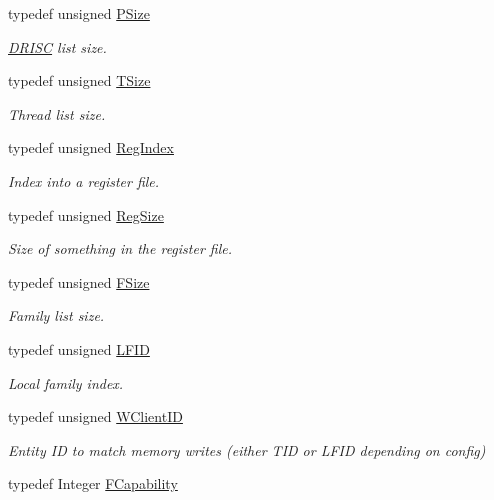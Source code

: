 \begin{DoxyCompactItemize}
typedef unsigned \hyperlink{namespace_simulator_a4aa07bee2f34beac11abf48a8ccc47c4}{P\+Size}
\begin{DoxyCompactList}\small\item\em \hyperlink{class_simulator_1_1_d_r_i_s_c}{D\+R\+I\+S\+C} list size. \end{DoxyCompactList}\item 
typedef unsigned \hyperlink{namespace_simulator_aefe00209f3ea9f8e24874de522c3c3e7}{T\+Size}
\begin{DoxyCompactList}\small\item\em Thread list size. \end{DoxyCompactList}\item 
typedef unsigned \hyperlink{namespace_simulator_ab00c9033de4c9a17db7b53d6c292515c}{Reg\+Index}
\begin{DoxyCompactList}\small\item\em Index into a register file. \end{DoxyCompactList}\item 
typedef unsigned \hyperlink{namespace_simulator_a7c5ca3b196c951c92b8159e54e76075f}{Reg\+Size}
\begin{DoxyCompactList}\small\item\em Size of something in the register file. \end{DoxyCompactList}\item 
typedef unsigned \hyperlink{namespace_simulator_a06544009313d7c13d411b1c074e5acff}{F\+Size}
\begin{DoxyCompactList}\small\item\em Family list size. \end{DoxyCompactList}\item 
typedef unsigned \hyperlink{namespace_simulator_aaccbc706b2d6c99085f52f6dfc2333e4}{L\+F\+I\+D}
\begin{DoxyCompactList}\small\item\em Local family index. \end{DoxyCompactList}\item 
typedef unsigned \hyperlink{namespace_simulator_a0de605c35951a450d074222efcef6359}{W\+Client\+I\+D}
\begin{DoxyCompactList}\small\item\em Entity I\+D to match memory writes (either T\+I\+D or L\+F\+I\+D depending on config) \end{DoxyCompactList}\item 
typedef Integer \hyperlink{namespace_simulator_a607aa9969bfe2711861ae21f42c37c59}{F\+Capability}

\end{DoxyCompactItemize}
